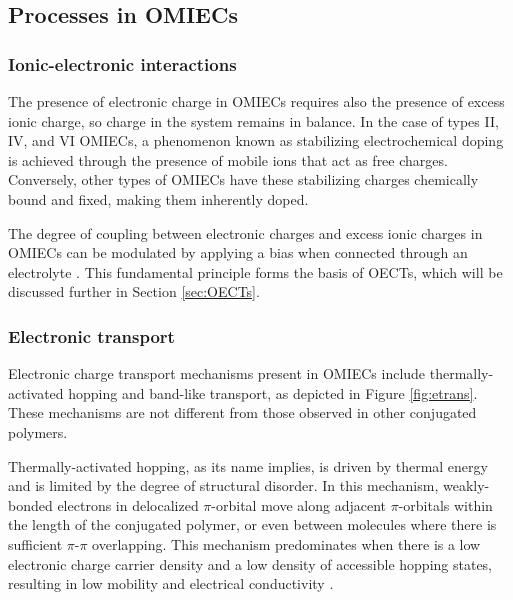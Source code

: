 \subsection{Processes in OMIECs}

\subsubsection{Ionic-electronic interactions}
The presence of electronic charge in OMIECs %
requires also the presence of excess ionic charge, so charge in the system remains in balance. In the case of types II, IV, and VI OMIECs, a phenomenon known as stabilizing electrochemical doping is achieved through the presence of mobile ions that act as free charges. Conversely, other types of OMIECs have these stabilizing charges chemically bound and fixed, making them inherently doped.


The degree of coupling between electronic charges and excess ionic charges in OMIECs can be modulated by applying a bias when connected through an electrolyte \cite{paulsenOrganicMixedIonic2020}. This fundamental principle forms the basis of OECTs, which will be discussed further in Section \ref{sec:OECTs}.

\subsubsection{Electronic transport}

Electronic charge transport mechanisms present in OMIECs include thermally-activated hopping and band-like transport, as depicted in Figure \ref{fig:etrans}. These mechanisms are not different from those observed in other conjugated polymers. 

Thermally-activated hopping, as its name implies, is driven by thermal energy and is limited by the degree of structural disorder. In this mechanism, weakly-bonded electrons in delocalized $\pi$-orbital move along adjacent $\pi$-orbitals within the length of the conjugated polymer, or even between molecules where there is sufficient $\pi$-$\pi$ overlapping. This mechanism predominates when there is a low electronic charge carrier density and a low density of accessible hopping states, resulting in low mobility and electrical conductivity \cite{paulsenOrganicMixedIonic2020}. 

